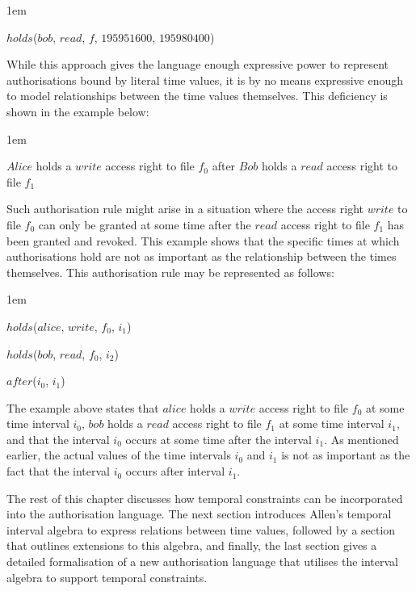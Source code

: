 \documentclass[11pt]{report}
\newenvironment{vquote}
{
  \begin{list}{}{\leftmargin 1em}\item[]
}
{
  \end{list}
}
\begin{document}
      \begin{vquote}
        $holds$($bob$, $read$, $f$, $195951600$, $195980400$)
      \end{vquote}

      While this approach gives the language enough expressive power to
      represent authorisations bound by literal time values, it is by no means
      expressive enough to model relationships between the time values
      themselves. This deficiency is shown in the example below:
 
      \begin{vquote}
        $Alice$ holds a $write$ access right to file $f_0$ after $Bob$ holds a
        $read$ access right to file $f_1$
      \end{vquote}
 
      Such authorisation rule might arise in a situation where the access right
      $write$ to file $f_0$ can only be granted at some time after the $read$
      access right to file $f_1$ has been granted and revoked. This example
      shows that the specific times at which authorisations hold are not as
      important as the relationship between the times themselves. This
      authorisation rule may be represented as follows:

      \begin{vquote}
        $holds$($alice$, $write$, $f_0$, $i_{1}$)
 
        $holds$($bob$, $read$, $f_0$, $i_{2}$)
 
        $after$($i_0$, $i_1$)
      \end{vquote}
 
      The example above states that $alice$ holds a $write$ access right to
      file $f_0$ at some time interval $i_0$, $bob$ holds a $read$ access right
      to file $f_1$ at some time interval $i_1$, and that the interval $i_0$
      occurs at some time after the interval $i_1$. As mentioned earlier, the
      actual values of the time intervals $i_0$ and $i_1$ is not as important
      as the fact that the interval $i_0$ occurs after interval $i_1$.

      The rest of this chapter discusses how temporal constraints can be
      incorporated into the authorisation language. The next section introduces
      Allen's temporal interval algebra to express relations between time
      values, followed by a section that outlines extensions to this algebra,
      and finally, the last section gives a detailed formalisation of a new
      authorisation language that utilises the interval algebra to support
      temporal constraints.
\end{document}
